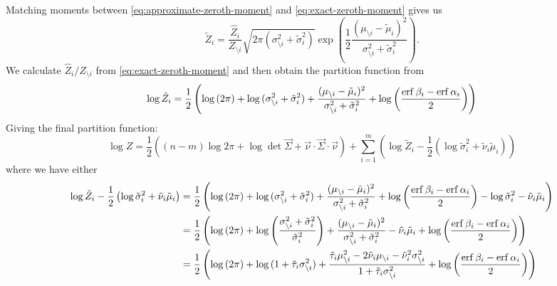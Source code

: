 \documentclass[11pt,twoside]{report}
\begin{document}
Matching moments between \eqref{eq:approximate-zeroth-moment} and \eqref{eq:exact-zeroth-moment} gives us
\begin{equation}
  \tilde{Z}_i = \frac{\hat{Z}_i}{Z_{\setminus i}}
  \sqrt{2 \pi (\sigma_{\setminus i}^2 + \tilde{\sigma}_i^2)}
  \exp{\left(
    \frac{1}{2}
    \frac{(\mu_{\setminus i} - \tilde{\mu}_i)^2}{\sigma_{\setminus i}^2 + \tilde{\sigma}_i^2}
    \right)}.
\end{equation}
We calculate $\hat{Z}_i / Z_{\setminus i}$ from \eqref{eq:exact-zeroth-moment} and then obtain the partition function from
\begin{equation}
  \log{\tilde{Z}_i} =
  \frac{1}{2} \left(
  \log{(2\pi)} +
  \log{(\sigma_{\setminus i}^2 + \tilde{\sigma}_i^2)} +
  \frac{(\mu_{\setminus i} - \tilde{\mu}_i)^2}{\sigma_{\setminus i}^2 + \tilde{\sigma}_i^2}
  + \log{\left(\frac{\operatorname{erf}{\beta_i} - \operatorname{erf}{\alpha_i}}{2}\right)}
  \right)
\end{equation}
Giving the final partition function:
\begin{equation}
  \log{Z} =
  \frac{1}{2} \left(
  (n-m) \log{2\pi}
  + \log\det{\vec{\Sigma}}
  + \vec{\nu} \cdot \vec{\Sigma} \cdot \vec{\nu}
  \right)
  + \sum_{i=1}^m \left(
  \log{\tilde{Z}_i}
  - \frac{1}{2}
  \left(
  \log{\tilde{\sigma}_i^2}
  + \tilde{\nu}_i \tilde{\mu}_i
  \right)
  \right)
\end{equation}
where we have either
\begin{equation}
  \begin{split}
  \log{\tilde{Z}_i}
  - \frac{1}{2}
  \left(
  \log{\tilde{\sigma}_i^2}
  + \tilde{\nu}_i \tilde{\mu}_i
  \right)
  &=
  \frac{1}{2} \left(
  \log{(2\pi)} +
  \log{(\sigma_{\setminus i}^2 + \tilde{\sigma}_i^2)} +
  \frac{(\mu_{\setminus i} - \tilde{\mu}_i)^2}{\sigma_{\setminus i}^2 + \tilde{\sigma}_i^2}
  + \log{\left(\frac{\operatorname{erf}{\beta_i} - \operatorname{erf}{\alpha_i}}{2}\right)}
  - \log{\tilde{\sigma}_i^2}
  - \tilde{\nu}_i \tilde{\mu}_i
  \right)
  \\
  &=
  \frac{1}{2} \left(
  \log{(2\pi)} +
  \log{\left(\frac{\sigma_{\setminus i}^2 + \tilde{\sigma}_i^2}{\tilde{\sigma}_i^2}\right)}
  + \frac{(\mu_{\setminus i} - \tilde{\mu}_i)^2}{\sigma_{\setminus i}^2 + \tilde{\sigma}_i^2}
  - \tilde{\nu}_i \tilde{\mu}_i
  + \log{\left(\frac{\operatorname{erf}{\beta_i} - \operatorname{erf}{\alpha_i}}{2}\right)}
  \right)
  \\
  &=
  \frac{1}{2} \left(
  \log{(2\pi)} +
  \log{(1 + \tilde{\tau}_i \sigma_{\setminus i}^2)}
  + \frac{\tilde{\tau}_i \mu_{\setminus i}^2 - 2\tilde{\nu}_i \mu_{\setminus i} - \tilde{\nu}_i^2 \sigma_{\setminus i}^2}
  {1 + \tilde{\tau}_i \sigma_{\setminus i}^2}
  + \log{\left(\frac{\operatorname{erf}{\beta_i} - \operatorname{erf}{\alpha_i}}{2}\right)}
  \right)
  \end{split}
\end{equation}
\end{document}
